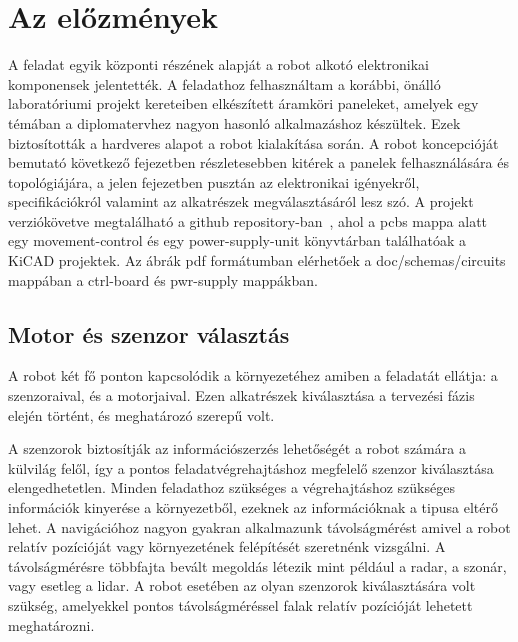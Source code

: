 \section{Az előzmények}

A feladat egyik központi részének alapját a robot alkotó elektronikai komponensek
jelentették. A feladathoz felhasználtam a korábbi, önálló laboratóriumi projekt
kereteiben elkészített áramköri paneleket, amelyek egy témában a diplomatervhez
nagyon hasonló alkalmazáshoz készültek. Ezek biztosították a hardveres alapot a
robot kialakítása során.  A robot koncepcióját bemutató következő fejezetben
részletesebben kitérek a panelek felhasználására és topológiájára, a jelen
fejezetben pusztán az elektronikai igényekről, specifikációkról valamint az
alkatrészek megválasztásáról lesz szó. A projekt verziókövetve megtalálható a
github repository-ban~\cite{RpirobotGitrepo}, ahol a pcbs mappa alatt egy
movement-control és egy power-supply-unit könyvtárban találhatóak a KiCAD
projektek. Az ábrák pdf formátumban elérhetőek a doc/schemas/circuits mappában a
ctrl-board és pwr-supply mappákban. 

\subsection{Motor és szenzor választás}

A robot két fő ponton kapcsolódik a környezetéhez amiben a feladatát ellátja: a
szenzoraival, és a motorjaival. Ezen alkatrészek kiválasztása a tervezési fázis
elején történt, és meghatározó szerepű volt.

\medskip

A szenzorok biztosítják az információszerzés lehetőségét a robot számára a
külvilág felől, így a pontos feladatvégrehajtáshoz megfelelő szenzor kiválasztása
elengedhetetlen.  Minden feladathoz szükséges a végrehajtáshoz szükséges
információk kinyerése a környezetből, ezeknek az információknak a tipusa eltérő
lehet. A navigációhoz nagyon gyakran alkalmazunk távolságmérést amivel a robot
relatív pozícióját vagy környezetének felépítését szeretnénk vizsgálni.  A
távolságmérésre többfajta bevált megoldás létezik mint például a radar, a szonár,
vagy esetleg a lidar. A robot esetében az olyan szenzorok kiválasztására volt
szükség, amelyekkel pontos távolságméréssel falak relatív pozícióját lehetett
meghatározni.

